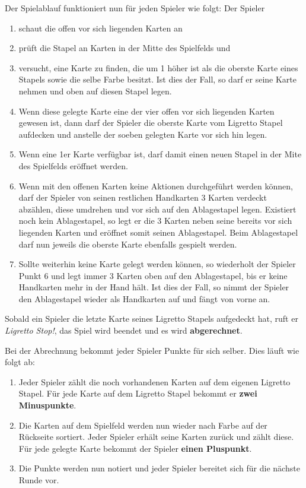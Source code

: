 Der Spielablauf funktioniert nun für jeden Spieler wie folgt: Der Spieler
\begin{enumerate}
	\item schaut die offen vor sich liegenden Karten an
	\item prüft die Stapel an Karten in der Mitte des Spielfelds und
	\item versucht, eine Karte zu finden, die um 1 höher ist als die oberste Karte eines Stapels sowie die selbe Farbe besitzt. Ist dies der Fall, so darf er seine Karte nehmen und oben auf diesen Stapel legen.
	\item Wenn diese gelegte Karte eine der vier offen vor sich liegenden Karten gewesen ist, dann darf der Spieler die oberste Karte vom Ligretto Stapel aufdecken und anstelle der soeben gelegten Karte vor sich hin legen.
	\item Wenn eine 1er Karte verfügbar ist, darf damit einen neuen Stapel in der Mite des Spielfelds eröffnet werden.
	\item Wenn mit den offenen Karten keine Aktionen durchgeführt werden können, darf der Spieler von seinen restlichen Handkarten 3 Karten verdeckt abzählen, diese umdrehen und vor sich auf den Ablagestapel legen. Existiert noch kein Ablagestapel, so legt er die 3 Karten neben seine bereits vor sich liegenden Karten und eröffnet somit seinen Ablagestapel. Beim Ablagestapel darf nun jeweils die oberste Karte ebenfalls gespielt werden.
	\item Sollte weiterhin keine Karte gelegt werden können, so wiederholt der Spieler Punkt 6 und legt immer 3 Karten oben auf den Ablagestapel, bis er keine Handkarten mehr in der Hand hält. Ist dies der Fall, so nimmt der Spieler den Ablagestapel wieder als Handkarten auf und fängt von vorne an.
\end{enumerate}

Sobald ein Spieler die letzte Karte seines Ligretto Stapels aufgedeckt hat, ruft er \textit{Ligretto Stop!}, das Spiel wird beendet und es wird \textbf{abgerechnet}.

Bei der Abrechnung bekommt jeder Spieler Punkte für sich selber. Dies läuft wie folgt ab:
\begin{enumerate}
	\item Jeder Spieler zählt die noch vorhandenen Karten auf dem eigenen Ligretto Stapel. Für jede Karte auf dem Ligretto Stapel bekommt er \textbf{zwei Minuspunkte}.
	\item Die Karten auf dem Spielfeld werden nun wieder nach Farbe auf der Rückseite sortiert. Jeder Spieler erhält seine Karten zurück und zählt diese. Für jede gelegte Karte bekommt der Spieler \textbf{einen Pluspunkt}.
	\item Die Punkte werden nun notiert und jeder Spieler bereitet sich für die nächste Runde vor.
\end{enumerate}